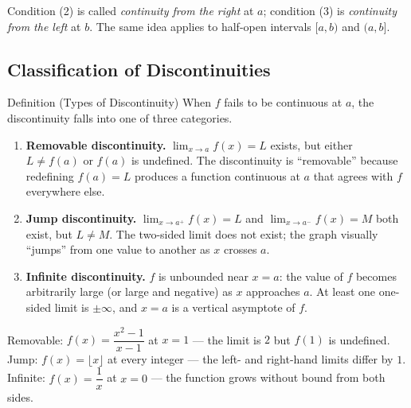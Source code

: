 \begin{remark*}
Condition (2) is called \emph{continuity from the right} at $a$;
condition (3) is \emph{continuity from the left} at $b$.
The same idea applies to half-open intervals $[a, b)$ and $(a, b]$.
\end{remark*}

\subsection*{Classification of Discontinuities}

\begin{propositionbox}{Definition (Types of Discontinuity)}
When $f$ fails to be continuous at $a$, the discontinuity falls into
one of three categories.
\begin{enumerate}
  \item \textbf{Removable discontinuity.}
        $\lim_{x \to a} f(x) = L$ exists, but either $L \neq f(a)$
        or $f(a)$ is undefined.
        The discontinuity is ``removable'' because redefining
        $f(a) = L$ produces a function continuous at $a$ that agrees
        with $f$ everywhere else.

  \item \textbf{Jump discontinuity.}
        $\lim_{x \to a^+} f(x) = L$ and $\lim_{x \to a^-} f(x) = M$
        both exist, but $L \neq M$.
        The two-sided limit does not exist; the graph visually
        ``jumps'' from one value to another as $x$ crosses $a$.

  \item \textbf{Infinite discontinuity.}
        $f$ is unbounded near $x = a$: the value of $f$ becomes
        arbitrarily large (or large and negative) as $x$ approaches
        $a$.
        At least one one-sided limit is $\pm\infty$, and $x = a$
        is a vertical asymptote of $f$.
\end{enumerate}
\end{propositionbox}

\begin{remark*}
Removable: $f(x) = \dfrac{x^2 - 1}{x - 1}$ at $x = 1$ --- the
limit is $2$ but $f(1)$ is undefined.
Jump: $f(x) = \lfloor x \rfloor$ at every integer --- the left- and
right-hand limits differ by $1$.
Infinite: $f(x) = \dfrac{1}{x}$ at $x = 0$ --- the function grows
without bound from both sides.
\end{remark*}


